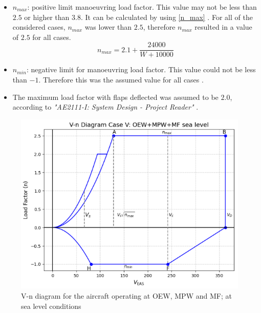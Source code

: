 \begin{itemize}
    \item $n_{max}$: positive limit manoeuvring load factor. This value may not be less than $2.5$ or higher than $3.8$. It can be calculated by using \autoref{n_max} \cite{Timmer2024AE2111-IReader}. For all of the considered cases, $n_{max}$ was lower than $2.5$, therefore $n_{max}$ resulted in a value of $2.5$ for all cases. 
    \begin{equation}
    \label{n_max}
        n_{max} = 2.1 + \frac{24000}{W+10000}
    \end{equation}
    
    \item $n_{min}$: negative limit for manoeuvring load factor. This value could not be less than $-1$. Therefore this was the assumed value for all cases \cite{Timmer2024AE2111-IReader}.
    \item The maximum load factor with flaps deflected was assumed to be $2.0$, according to \textit{"AE2111-I: System Design - Project Reader" } \cite{Timmer2024AE2111-IReader}.
\end{itemize}

\begin{figure}[H]
    \centering
    \includegraphics[width=0.65\linewidth]{figures/v-n diagram case V.png}
    \caption{V-n diagram for the aircraft operating at OEW, MPW and MF; at sea level conditions} 
    \label{fig:v-ncaseCrit}
\end{figure}

